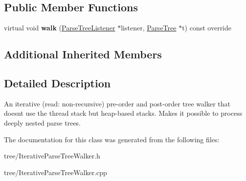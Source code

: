 \subsection*{Public Member Functions}
\begin{DoxyCompactItemize}
\item 
\mbox{\label{classantlr4_1_1tree_1_1IterativeParseTreeWalker_a9e06f08e36dbe4bc96dc7ad24cc2ad24}} 
virtual void {\bfseries walk} (\hyperlink{classantlr4_1_1tree_1_1ParseTreeListener}{Parse\+Tree\+Listener} $\ast$listener, \hyperlink{classantlr4_1_1tree_1_1ParseTree}{Parse\+Tree} $\ast$t) const override
\end{DoxyCompactItemize}
\subsection*{Additional Inherited Members}


\subsection{Detailed Description}
An iterative (read\+: non-\/recursive) pre-\/order and post-\/order tree walker that doesn\textquotesingle{}t use the thread stack but heap-\/based stacks. Makes it possible to process deeply nested parse trees. 

The documentation for this class was generated from the following files\+:\begin{DoxyCompactItemize}
\item 
tree/Iterative\+Parse\+Tree\+Walker.\+h\item 
tree/Iterative\+Parse\+Tree\+Walker.\+cpp\end{DoxyCompactItemize}
